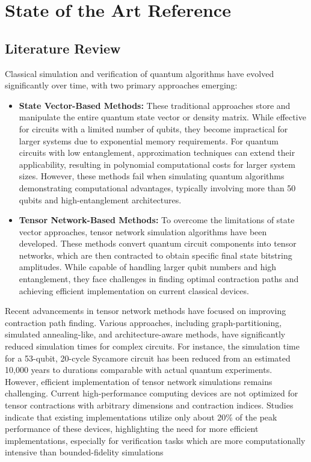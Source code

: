 \documentclass[12pt,oneside,a4paper]{article}
\begin{document}
\section{State of the Art Reference}

\subsection{Literature Review}
Classical simulation and verification of quantum algorithms have evolved significantly over time, with two primary approaches emerging:
\begin{itemize}
	\item \textbf{State Vector-Based Methods:} These traditional approaches store and manipulate the entire quantum state vector or density matrix. While effective for circuits with a limited number of qubits, they become impractical for larger systems due to exponential memory requirements. For quantum circuits with low entanglement, approximation techniques can extend their applicability, resulting in polynomial computational costs for larger system sizes. However, these methods fail when simulating quantum algorithms demonstrating computational advantages, typically involving more than 50 qubits and high-entanglement architectures.
	\item \textbf{Tensor Network-Based Methods:} To overcome the limitations of state vector approaches, tensor network simulation algorithms have been developed. These methods convert quantum circuit components into tensor networks, which are then contracted to obtain specific final state bitstring amplitudes. While capable of handling larger qubit numbers and high entanglement, they face challenges in finding optimal contraction paths and achieving efficient implementation on current classical devices.
\end{itemize}
Recent advancements in tensor network methods have focused on improving contraction path finding. Various approaches, including graph-partitioning, simulated annealing-like, and architecture-aware methods, have significantly reduced simulation times for complex circuits. For instance, the simulation time for a 53-qubit, 20-cycle Sycamore circuit has been reduced from an estimated 10,000 years to durations comparable with actual quantum experiments.
However, efficient implementation of tensor network simulations remains challenging. Current high-performance computing devices are not optimized for tensor contractions with arbitrary dimensions and contraction indices. Studies indicate that existing implementations utilize only about 20\% of the peak performance of these devices, highlighting the need for more efficient implementations, especially for verification tasks which are more computationally intensive than bounded-fidelity simulations
\end{document}
